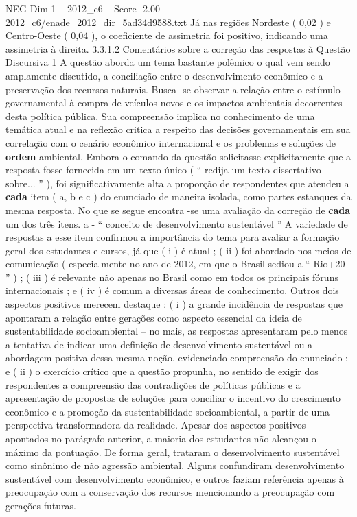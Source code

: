 \begin{textsample}{NEG Dim 1 – 2012\_c6 – Score -2.00 – 2012\_c6/enade\_2012\_dir\_5ad34d9588.txt}
Já nas regiões Nordeste ( 0,02 ) e Centro-Oeste ( 0,04 ), o coeficiente de assimetria foi positivo, indicando uma assimetria à direita. 3.3.1.2 Comentários sobre a correção das respostas à Questão Discursiva 1 A questão aborda um tema bastante polêmico o qual vem sendo amplamente discutido, a conciliação entre o desenvolvimento econômico e a preservação dos recursos naturais.
Busca -se observar a relação entre o estímulo governamental à compra de veículos novos e os impactos ambientais decorrentes desta política pública.
Sua compreensão implica no conhecimento de uma temática atual e na reflexão critica a respeito das decisões governamentais em sua correlação com o cenário econômico internacional e os problemas e soluções de \textbf{ordem} ambiental.
Embora o comando da questão solicitasse explicitamente que a resposta fosse fornecida em um texto único ( “ redija um texto dissertativo sobre... ” ), foi significativamente alta a proporção de respondentes que atendeu a \textbf{cada} item ( a, b e c ) do enunciado de maneira isolada, como partes estanques da mesma resposta.
No que se segue encontra -se uma avaliação da correção de \textbf{cada} um dos três itens. a - “ conceito de desenvolvimento sustentável ” A variedade de respostas a esse item confirmou a importância do tema para avaliar a formação geral dos estudantes e cursos, já que ( i ) é atual ; ( ii ) foi abordado nos meios de comunicação ( especialmente no ano de 2012, em que o Brasil sediou a “ Rio+20 ” ) ; ( iii ) é relevante não apenas no Brasil como em todos os principais fóruns internacionais ; e ( iv ) é comum a diversas áreas de conhecimento.
Outros dois aspectos positivos merecem destaque : ( i ) a grande incidência de respostas que apontaram a relação entre gerações como aspecto essencial da ideia de sustentabilidade socioambiental – no mais, as respostas apresentaram pelo menos a tentativa de indicar uma definição de desenvolvimento sustentável ou a abordagem positiva dessa mesma noção, evidenciado compreensão do enunciado ; e ( ii ) o exercício crítico que a questão propunha, no sentido de exigir dos respondentes a compreensão das contradições de políticas públicas e a apresentação de propostas de soluções para conciliar o incentivo do crescimento econômico e a promoção da sustentabilidade socioambiental, a partir de uma perspectiva transformadora da realidade.
Apesar dos aspectos positivos apontados no parágrafo anterior, a maioria dos estudantes não alcançou o máximo da pontuação.
De forma geral, trataram o desenvolvimento sustentável como sinônimo de não agressão ambiental.
Alguns confundiram desenvolvimento sustentável com desenvolvimento econômico, e outros faziam referência apenas à preocupação com a conservação dos recursos mencionando a preocupação com gerações futuras.

\end{textsample}
